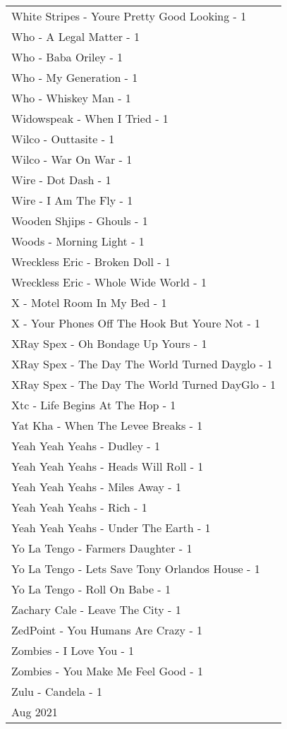 \documentclass[
]{article}
\begin{document}
\begin{longtable}{l}
White Stripes - Youre Pretty Good Looking - 1 \\ 
Who - A Legal Matter - 1 \\ 
Who - Baba Oriley - 1 \\ 
Who - My Generation - 1 \\ 
Who - Whiskey Man - 1 \\ 
Widowspeak - When I Tried - 1 \\ 
Wilco - Outtasite - 1 \\ 
Wilco - War On War - 1 \\ 
Wire - Dot Dash - 1 \\ 
Wire - I Am The Fly - 1 \\ 
Wooden Shjips - Ghouls - 1 \\ 
Woods - Morning Light - 1 \\ 
Wreckless Eric - Broken Doll - 1 \\ 
Wreckless Eric - Whole Wide World - 1 \\ 
X - Motel Room In My Bed - 1 \\ 
X - Your Phones Off The Hook But Youre Not - 1 \\ 
XRay Spex - Oh Bondage Up Yours - 1 \\ 
XRay Spex - The Day The World Turned Dayglo - 1 \\ 
XRay Spex - The Day The World Turned DayGlo - 1 \\ 
Xtc - Life Begins At The Hop - 1 \\ 
Yat Kha - When The Levee Breaks - 1 \\ 
Yeah Yeah Yeahs - Dudley - 1 \\ 
Yeah Yeah Yeahs - Heads Will Roll - 1 \\ 
Yeah Yeah Yeahs - Miles Away - 1 \\ 
Yeah Yeah Yeahs - Rich - 1 \\ 
Yeah Yeah Yeahs - Under The Earth - 1 \\ 
Yo La Tengo - Farmers Daughter - 1 \\ 
Yo La Tengo - Lets Save Tony Orlandos House - 1 \\ 
Yo La Tengo - Roll On Babe - 1 \\ 
Zachary Cale - Leave The City - 1 \\ 
ZedPoint - You Humans Are Crazy - 1 \\ 
Zombies - I Love You - 1 \\ 
Zombies - You Make Me Feel Good - 1 \\ 
Zulu - Candela - 1 \\ 
\midrule
\multicolumn{1}{l}{Aug 2021} \\ 

\end{longtable}
\end{document}
